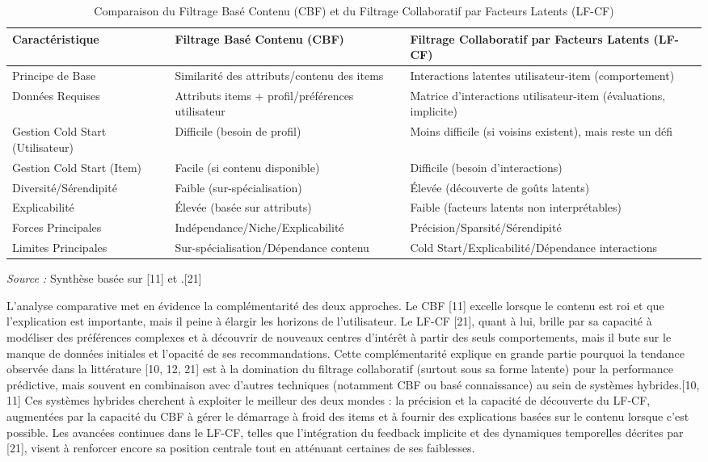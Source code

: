 \documentclass[11pt,a4paper]{article}
\begin{document}
\begin{table}[ht]
\centering
\caption{Comparaison du Filtrage Basé Contenu (CBF) et du Filtrage Collaboratif par Facteurs Latents (LF-CF)}
\label{tab:cbf_vs_cf}
\begin{adjustbox}{width=\textwidth}
\begin{tabular}{@{}lll@{}}
\toprule
Caractéristique & Filtrage Basé Contenu (CBF) & Filtrage Collaboratif par Facteurs Latents (LF-CF) \\ \midrule
Principe de Base & Similarité des attributs/contenu des items & Interactions latentes utilisateur-item (comportement) \\
Données Requises & Attributs items + profil/préférences utilisateur & Matrice d'interactions utilisateur-item (évaluations, implicite) \\
Gestion Cold Start (Utilisateur) & Difficile (besoin de profil) & Moins difficile (si voisins existent), mais reste un défi \\
Gestion Cold Start (Item) & Facile (si contenu disponible) & Difficile (besoin d'interactions) \\
Diversité/Sérendipité & Faible (sur-spécialisation) & Élevée (découverte de goûts latents) \\
Explicabilité & Élevée (basée sur attributs) & Faible (facteurs latents non interprétables) \\
Forces Principales & Indépendance/Niche/Explicabilité & Précision/Sparsité/Sérendipité \\
Limites Principales & Sur-spécialisation/Dépendance contenu & Cold Start/Explicabilité/Dépendance interactions \\ \bottomrule
\end{tabular}
\end{adjustbox}
\footnotesize{\textit{Source :} Synthèse basée sur \citet{Ko2022} [11] et \citet{Koren2011}.[21]}
\end{table}

L'analyse comparative met en évidence la complémentarité des deux approches. Le CBF [11] excelle lorsque le contenu est roi et que l'explication est importante, mais il peine à élargir les horizons de l'utilisateur. Le LF-CF [21], quant à lui, brille par sa capacité à modéliser des préférences complexes et à découvrir de nouveaux centres d'intérêt à partir des seuls comportements, mais il bute sur le manque de données initiales et l'opacité de ses recommandations. Cette complémentarité explique en grande partie pourquoi la tendance observée dans la littérature [10, 12, 21] est à la domination du filtrage collaboratif (surtout sous sa forme latente) pour la performance prédictive, mais souvent en combinaison avec d'autres techniques (notamment CBF ou basé connaissance) au sein de systèmes hybrides.[10, 11] Ces systèmes hybrides cherchent à exploiter le meilleur des deux mondes : la précision et la capacité de découverte du LF-CF, augmentées par la capacité du CBF à gérer le démarrage à froid des items et à fournir des explications basées sur le contenu lorsque c'est possible. Les avancées continues dans le LF-CF, telles que l'intégration du feedback implicite et des dynamiques temporelles décrites par \citet{Koren2011} [21], visent à renforcer encore sa position centrale tout en atténuant certaines de ses faiblesses.
\end{document}
